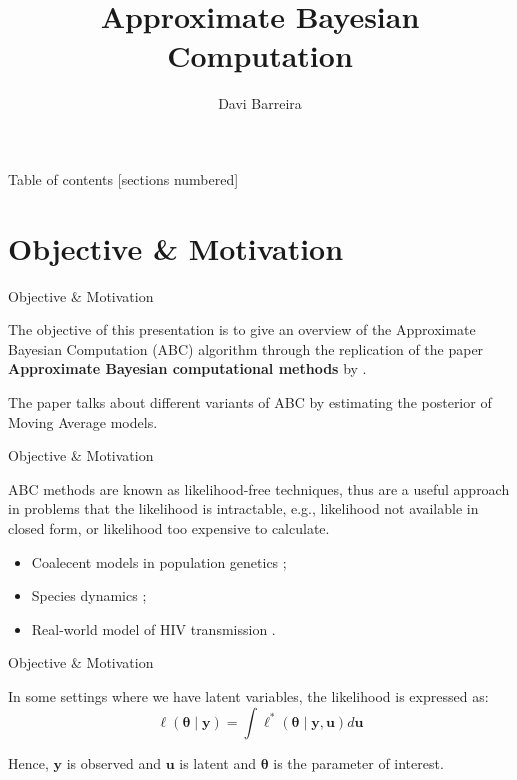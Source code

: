 \documentclass[10pt]{beamer}
\title{Approximate Bayesian Computation}
\subtitle{}
\date{}
\author{Davi Barreira}
\institute{FGV - Escola de Matemática Aplicada}
\begin{document}
\maketitle

\begin{frame}{Table of contents}
  [sections numbered]
  \tableofcontents[hideallsubsections]
\end{frame}

\AtBeginSection{}
\section[Objective Motivation]{Objective \& Motivation}
\begin{frame}[fragile]{Objective \& Motivation}

  The objective of this presentation is to give an overview of
  the Approximate Bayesian Computation (ABC) algorithm through the
  replication of the
  paper \textbf{Approximate Bayesian computational methods} by
  \cite{Marin2012}.

  The paper talks about different variants of ABC by estimating the
  posterior of Moving Average models.

\end{frame}

\begin{frame}[fragile]{Objective \& Motivation}

  ABC methods are known as likelihood-free techniques, thus are
  a useful approach in problems that the likelihood is intractable, e.g., likelihood not available in
  closed form, or likelihood too expensive to calculate.
  \begin{itemize}
    \item Coalecent models in population genetics \citep{Tavare505};
    \item Species dynamics \citep{Jabot2016};
    \item Real-world model of HIV transmission \citep{McKinley2018}.
  \end{itemize}

\end{frame}

\begin{frame}[fragile]{Objective \& Motivation}

  In some settings where we have latent variables, the likelihood is
  expressed as:
  $$\ell(\bm\theta \mid \bm y) =
  \bm\int \ell^*(\bm\theta \mid \bm y, \bm u) d\bm u$$

  Hence, $\bm y$ is observed and $\bm u$ is latent and $\bm\theta$
  is the parameter of interest.

\end{frame}
\end{document}
